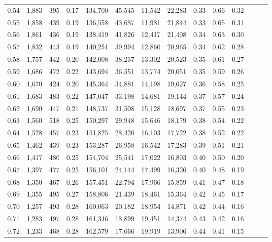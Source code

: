\begin{tabular}{rrrrrrrrrrrrrr}
0.54 &  1,883 &  395 &  0.17 &  134,700 &   45,545 &  11,542 &  22,283 &  0.33 &  0.66 &      0.32 \\
0.55 &  1,858 &  439 &  0.19 &  136,558 &   43,687 &  11,981 &  21,844 &  0.33 &  0.65 &      0.31 \\
0.56 &  1,861 &  436 &  0.19 &  138,419 &   41,826 &  12,417 &  21,408 &  0.34 &  0.63 &      0.30 \\
0.57 &  1,832 &  443 &  0.19 &  140,251 &   39,994 &  12,860 &  20,965 &  0.34 &  0.62 &      0.28 \\
0.58 &  1,757 &  442 &  0.20 &  142,008 &   38,237 &  13,302 &  20,523 &  0.35 &  0.61 &      0.27 \\
0.59 &  1,686 &  472 &  0.22 &  143,694 &   36,551 &  13,774 &  20,051 &  0.35 &  0.59 &      0.26 \\
0.60 &  1,670 &  424 &  0.20 &  145,364 &   34,881 &  14,198 &  19,627 &  0.36 &  0.58 &      0.25 \\
0.61 &  1,683 &  483 &  0.22 &  147,047 &   33,198 &  14,681 &  19,144 &  0.37 &  0.57 &      0.24 \\
0.62 &  1,690 &  447 &  0.21 &  148,737 &   31,508 &  15,128 &  18,697 &  0.37 &  0.55 &      0.23 \\
0.63 &  1,560 &  518 &  0.25 &  150,297 &   29,948 &  15,646 &  18,179 &  0.38 &  0.54 &      0.22 \\
0.64 &  1,528 &  457 &  0.23 &  151,825 &   28,420 &  16,103 &  17,722 &  0.38 &  0.52 &      0.22 \\
0.65 &  1,462 &  439 &  0.23 &  153,287 &   26,958 &  16,542 &  17,283 &  0.39 &  0.51 &      0.21 \\
0.66 &  1,417 &  480 &  0.25 &  154,704 &   25,541 &  17,022 &  16,803 &  0.40 &  0.50 &      0.20 \\
0.67 &  1,397 &  477 &  0.25 &  156,101 &   24,144 &  17,499 &  16,326 &  0.40 &  0.48 &      0.19 \\
0.68 &  1,350 &  467 &  0.26 &  157,451 &   22,794 &  17,966 &  15,859 &  0.41 &  0.47 &      0.18 \\
0.69 &  1,355 &  495 &  0.27 &  158,806 &   21,439 &  18,461 &  15,364 &  0.42 &  0.45 &      0.17 \\
0.70 &  1,257 &  493 &  0.28 &  160,063 &   20,182 &  18,954 &  14,871 &  0.42 &  0.44 &      0.16 \\
0.71 &  1,283 &  497 &  0.28 &  161,346 &   18,899 &  19,451 &  14,374 &  0.43 &  0.42 &      0.16 \\
0.72 &  1,233 &  468 &  0.28 &  162,579 &   17,666 &  19,919 &  13,906 &  0.44 &  0.41 &      0.15 \\

\end{tabular}
